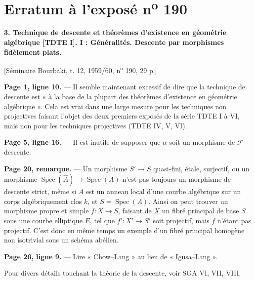 \clearpage
\chapter*{Erratum à l'exposé n\textsuperscript{o} 190}
\setcounter{footnote}{0}

\noindent\textbf{3. Technique de descente et théorèmes d'existence en
géométrie algébrique [TDTE I]. I : Généralités. Descente par morphismes
fidèlement plats.}

\begin{center}
[Séminaire Bourbaki, t. 12, 1959/60, n\textsuperscript{o} 190, 29 p.]
\end{center}

\noindent\textbf{Page 1, ligne 10.} --- Il semble maintenant excessif de dire
que la technique de descente est « à la base de la plupart des théorèmes
d'existence en géométrie algébrique ». Cela est vrai dans une large mesure
pour les techniques non projectives faisant l'objet des deux premiers exposés
de la série TDTE I à VI, mais non pour les techniques projectives (TDTE IV, V,
VI).

\noindent\textbf{Page 5, ligne 16.} --- Il est inutile de supposer que $\alpha$
soit un morphisme de $\mathcal F$-descente.

\noindent\textbf{Page 20, remarque.} --- Un morphisme
$S'\longrightarrow S$ quasi-fini, étale, surjectif, ou un morphisme
$\operatorname{Spec}(\widehat A)\longrightarrow\operatorname{Spec}(A)$ n'est
pas toujours un morphisme de descente strict, même si $A$ est un anneau local
d'une courbe algébrique sur un corps algébriquement clos $k$, et
$S=\operatorname{Spec}(A)$. Ainsi on peut trouver un morphisme propre et simple
$f:X\longrightarrow S$, faisant de $X$ un fibré principal de base $S$ sous une
courbe elliptique $E$, tel que $f':X'\longrightarrow S'$ soit projectif, mais
$f$ n'étant pas projectif. C'est donc en même temps un exemple d'un fibré
principal homogène non isotrivial sous un schéma abélien.

\noindent\textbf{Page 26, ligne 9.} --- Lire « Chow--Lang » au lieu de
« Igusa--Lang ».

Pour divers détails touchant la théorie de la descente, voir SGA VI, VII,
VIII.

\par\smallskip
\begingroup\footnotesize
\endgroup
